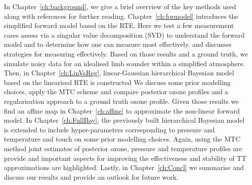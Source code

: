 In Chapter~\ref{ch:background}, we give a brief overview of the key methods used along with references for further reading.
Chapter~\ref{ch:formodel} introduces the simplified forward model based on the RTE.
Here we test a few measurement cases assess via a singular value decomposition (SVD) to understand the forward model and to determine how one can measure most effectively. and discusses strategies for measuring effectively.
Based on those results and a ground truth, we simulate noisy data for an idealised limb sounder within a simplified atmosphere.
Then, in Chapter~\ref{ch:LinVsReg}, linear-Gaussian hierarchical Bayesian model based on the linearised RTE is constructed
We discuss some prior modelling choices, apply the MTC scheme and compare posterior ozone profiles and a regularisation approach to a ground truth ozone profile.
Given those results we find an affine map in Chapter~\ref{ch:affine} to approximate the non-linear forward model.
In Chapter~\ref{ch:FullBay}, the previously built hierarchical Bayesian model is extended to include hyper-parameters corresponding to pressure and temperature and touch on some prior modelling choices. 
Again, using the MTC method joint estimates of posterior ozone, pressure and temperature profiles are provide and important aspects for improving the effectiveness and stability of TT approximations are highlighted.
Lastly, in Chapter~\ref{ch:Concl} we summarise and discuss our results and provide an outlook for future work.

